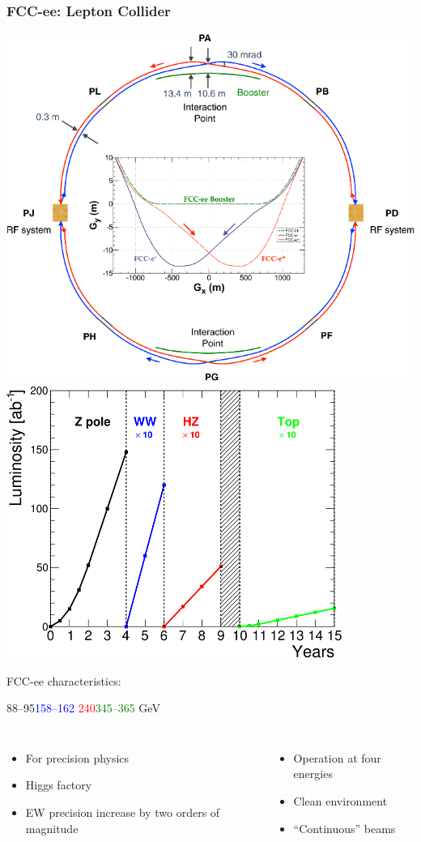 \documentclass[aspectratio=169]{beamer}
\newcommand{\bluetext}[1]{%
  \textcolor{myBlue}{#1}
}
\begin{document}
\begin{frame}
  \frametitle{FCC-ee: Lepton Collider}

  \includegraphics[width=.49\linewidth]{figures/FCC_ee_ring.png}
  \includegraphics[width=.49\linewidth]{figures/FCC_ee_operation_plan.png}

  \bluetext{FCC-ee characteristics:}
  {\footnotesize\hspace{5em}88--95\hspace{0.7em}\textcolor{blue}{158--162}
  \hspace{0.7em}\textcolor{red}{240}\hspace{0.7em}\textcolor{green}{345--365}
  GeV}
  \begin{columns}[c]
    \begin{itemize}
      \item For precision physics
      \item Higgs factory
      \item EW precision increase by two orders of magnitude
    \end{itemize}

    \begin{itemize}
      \item Operation at four energies
      \item Clean environment
      \item ``Continuous'' beams
    \end{itemize}
  \end{columns}
\end{frame}
\end{document}
